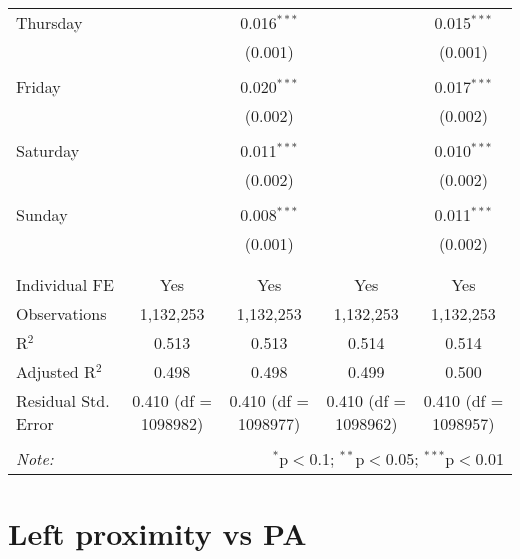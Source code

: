 \documentclass[
]{article}
\begin{document}
\begin{table}[!htbp]
{\begin{tabular}{@{\extracolsep{5pt}}lcccc}
 Thursday &  & 0.016$^{***}$ &  & 0.015$^{***}$ \\ 
  &  & (0.001) &  & (0.001) \\ 
  & & & & \\ 
 Friday &  & 0.020$^{***}$ &  & 0.017$^{***}$ \\ 
  &  & (0.002) &  & (0.002) \\ 
  & & & & \\ 
 Saturday &  & 0.011$^{***}$ &  & 0.010$^{***}$ \\ 
  &  & (0.002) &  & (0.002) \\ 
  & & & & \\ 
 Sunday &  & 0.008$^{***}$ &  & 0.011$^{***}$ \\ 
  &  & (0.001) &  & (0.002) \\ 
  & & & & \\ 
\hline \\[-1.8ex] 
Individual FE & Yes & Yes & Yes & Yes \\ 
Observations & 1,132,253 & 1,132,253 & 1,132,253 & 1,132,253 \\ 
R$^{2}$ & 0.513 & 0.513 & 0.514 & 0.514 \\ 
Adjusted R$^{2}$ & 0.498 & 0.498 & 0.499 & 0.500 \\ 
Residual Std. Error & 0.410 (df = 1098982) & 0.410 (df = 1098977) & 0.410 (df = 1098962) & 0.410 (df = 1098957) \\ 
\hline 
\hline \\[-1.8ex] 
\textit{Note:}  & \multicolumn{4}{r}{$^{*}$p$<$0.1; $^{**}$p$<$0.05; $^{***}$p$<$0.01} \\ 
\end{tabular}
} 
\end{table} 
\newpage
\section{Left proximity vs PA}
\end{document}
